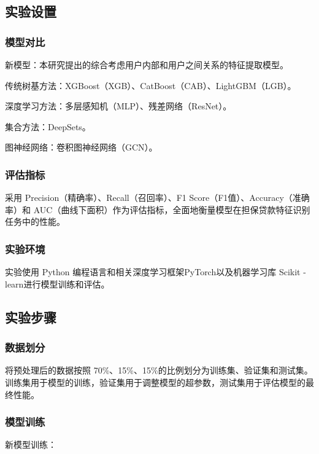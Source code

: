 \documentclass{article}
\begin{document}
\subsection{实验设置}

\subsubsection{模型对比}

新模型：本研究提出的综合考虑用户内部和用户之间关系的特征提取模型。

传统树基方法：XGBoost（XGB）、CatBoost（CAB）、LightGBM（LGB）。

深度学习方法：多层感知机（MLP）、残差网络（ResNet）。

集合方法：DeepSets。

图神经网络：卷积图神经网络（GCN）。

\subsubsection{评估指标}

采用 Precision（精确率）、Recall（召回率）、F1 Score（F1值）、Accuracy（准确率）和 AUC（曲线下面积）作为评估指标，全面地衡量模型在担保贷款特征识别任务中的性能。

\subsubsection{实验环境}

实验使用 Python 编程语言和相关深度学习框架PyTorch以及机器学习库 Scikit - learn进行模型训练和评估。

\subsection{实验步骤}

\subsubsection{数据划分}

将预处理后的数据按照 70\%、15\%、15\%的比例划分为训练集、验证集和测试集。训练集用于模型的训练，验证集用于调整模型的超参数，测试集用于评估模型的最终性能。

\subsubsection{模型训练}

新模型训练：
\end{document}
